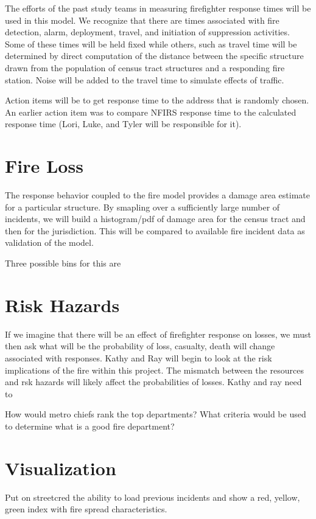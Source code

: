 \documentclass[11pt]{article} %
\begin{document}
The efforts of the past study teams in measuring firefighter response times will be used in this model.  We recognize that there are times associated with fire detection, alarm, deployment, travel, and initiation of suppression activities. Some of these times will be held fixed while others, such as travel time will be determined by direct computation of the distance between the specific structure drawn from the population of census tract structures and a responding fire station.  Noise will be added to the travel time to simulate effects of traffic. 

Action items will be to get response time to the address that is randomly chosen.  An earlier action item was to compare NFIRS response time to the calculated response time (Lori, Luke, and Tyler will be responsible for it).


\section{Fire Loss}

The response behavior coupled to the fire model provides a damage area estimate for a particular structure.  By smapling over a sufficiently large number of incidents, we will build a histogram/pdf of damage area for the census tract and then for the jurisdiction.  This will be compared to available fire incident data as validation of the model.

Three possible bins for this are 

\section{Risk Hazards}
If we imagine that there will be an effect of firefighter response on losses, we must then ask what will be the probability of loss, casualty, death will change associated with responses.  Kathy and Ray will begin to look at the risk implications of the fire within this project.  The mismatch between the resources and rsk hazards will likely affect the probabilities of losses.  Kathy and ray need to 


How would metro chiefs rank the top departments?  What criteria would be used to determine what is a good fire department?  

\section{Visualization}

Put on streetcred the ability to load previous incidents and show a red, yellow, green index with fire spread characteristics.
\end{document}
